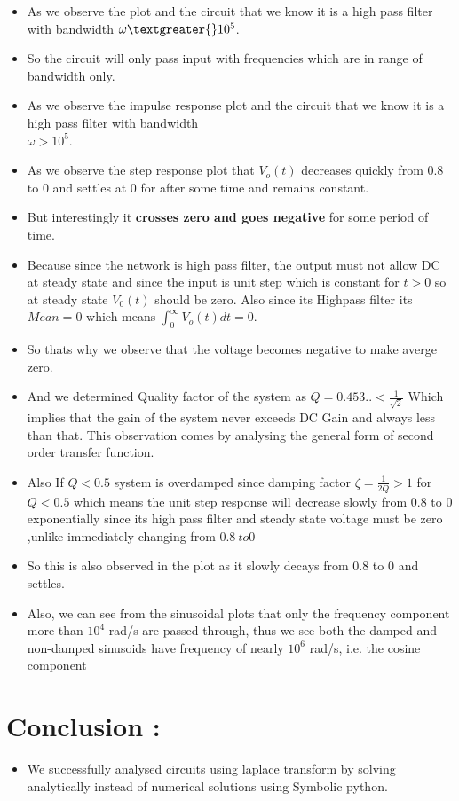 \documentclass[11pt, a4paper]{article}
\begin{document}
\begin{itemize}
  \item
  As we observe the plot and the circuit that we know it is a high pass
  filter with bandwidth $ \omega \textgreater{} 10^{5}$.
\item
  So the circuit will only pass input with frequencies which are in
  range of bandwidth only.
  \item
  As we observe the impulse response plot and the circuit that we know it is a high pass
  filter with bandwidth \\ \(\omega > 10^5\).

\item
  As we observe the step response plot that \(V_{o}(t)\) decreases quickly from 0.8 to
  0 and settles at 0 for after some time and remains constant.
\item
  But interestingly it \textbf{crosses zero and goes negative} for some
  period of time.
\item
  Because since the network is high pass filter, the output must not
  allow DC at steady state and since the input is unit step which is
  constant for \(t>0\) so at steady state \(V_{0}(t)\) should be zero.
  Also since its Highpass filter its \(Mean = 0\) which means
  \(\int_{0}^{\infty} V_{o}(t) dt = 0\).
\item
  So thats why we observe that the voltage becomes negative to make
  averge zero.
\item
  And we determined Quality factor of the system as
  \(Q = 0.453.. < \frac{1}{\sqrt{2}}\) Which implies that the gain of
  the system never exceeds DC Gain and always less than that. This
  observation comes by analysing the general form of second order
  transfer function.

\item
  Also If \(Q < 0.5\) system is overdamped since damping factor
  \(\zeta = \frac{1}{2Q} > 1\) for \(Q<0.5\) which means the unit step
  response will decrease slowly from 0.8 to \(0\) exponentially since
  its high pass filter and steady state voltage must be zero ,unlike
  immediately changing from \(0.8 \ to 0\)
\item
  So this is also observed in the plot as it slowly decays from 0.8 to 0
  and settles.
\item
  Also, we can see from the sinusoidal plots that only the frequency component 
  more than $10^{4}$ rad/s are passed through, thus we see both the damped and non-damped sinusoids have frequency of nearly $10^6$ rad/s, i.e. the cosine component
\end{itemize}
    \section{Conclusion :}\label{conclusion}

    \begin{itemize}

\item
  We successfully analysed circuits using laplace transform by solving
  analytically instead of numerical solutions using Symbolic python.
\end{itemize}


      
\end{document}

